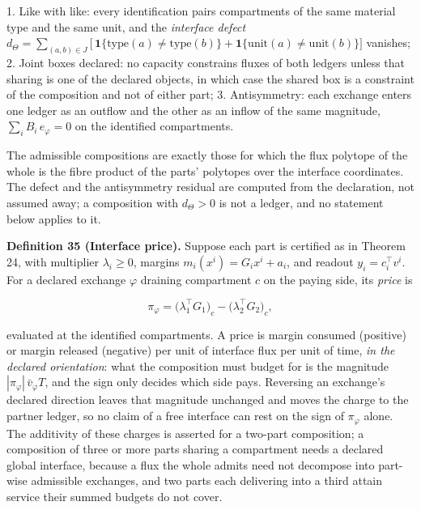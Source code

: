 \documentclass[11pt]{article}
\begin{document}
1. Like with like: every identification pairs compartments of the same material type and the same unit, and the \emph{interface defect} \(d_\Theta =\allowbreak{} \sum_{(a,\allowbreak{}b) \in J} \bigl[\,\allowbreak{}\mathbf 1\{\mathrm{type}(a) \ne \mathrm{type}(b)\} +\allowbreak{} \mathbf 1\{\mathrm{unit}(a) \ne \mathrm{unit}(b)\}\bigr]\) vanishes; 2. Joint boxes declared: no capacity constrains fluxes of both ledgers unless that sharing is one of the declared objects, in which case the shared box is a constraint of the composition and not of either part; 3. Antisymmetry: each exchange enters one ledger as an outflow and the other as an inflow of the same magnitude, \(\textstyle\sum_{i} B_i\,\allowbreak{} e_\varphi =\allowbreak{} 0\) on the identified compartments.

The admissible compositions are exactly those for which the flux polytope of the whole is the fibre product of the parts' polytopes over the interface coordinates. The defect and the antisymmetry residual are computed from the declaration, not assumed away; a composition with \(d_\Theta > 0\) is not a ledger, and no statement below applies to it.

\textbf{Definition 35 (Interface price).} Suppose each part is certified as in Theorem 24, with multiplier \(\lambda_i \ge 0\), margins \(m_i(x^i) = G_i x^i + a_i\), and readout \(y_i = c_i^{\top} v^i\). For a declared exchange \(\varphi\) draining compartment \(c\) on the paying side, its \emph{price} is 

$$\pi_\varphi = \bigl(\lambda_1^{\top} G_1\bigr)_c - \bigl(\lambda_2^{\top} G_2\bigr)_c ,$$

 evaluated at the identified compartments. A price is margin consumed (positive) or margin released (negative) per unit of interface flux per unit of time, \emph{in the declared orientation}: what the composition must budget for is the magnitude \(|\pi_\varphi|\,\allowbreak{}\bar v_\varphi T\), and the sign only decides which side pays. Reversing an exchange's declared direction leaves that magnitude unchanged and moves the charge to the partner ledger, so no claim of a free interface can rest on the sign of \(\pi_\varphi\) alone. The additivity of these charges is asserted for a two-part composition; a composition of three or more parts sharing a compartment needs a declared global interface, because a flux the whole admits need not decompose into part-wise admissible exchanges, and two parts each delivering into a third attain service their summed budgets do not cover.
\end{document}

